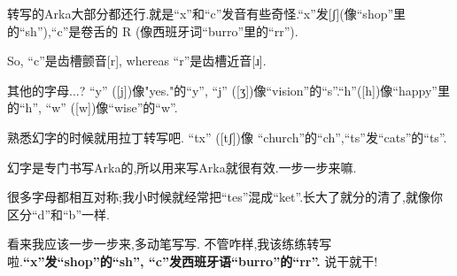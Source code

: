 转写的Arka大部分都还行.就是``x''和``c''发音有些奇怪.``x''发[ʃ](像``shop''里的``sh''),``c''是卷舌的 R (像西班牙词``burro''里的``rr'').

So, ``c''是齿槽颤音[r], whereas ``r''是齿槽近音[ɹ].

其他的字母...? ``y'' ([j])像"yes."的``y'', ``j'' ([ʒ])像``vision''的``s''.``h''([h])像``happy''里的``h'', ``w'' ([w])像``wise''的``w''.


熟悉幻字的时候就用拉丁转写吧. ``tx'' ([tʃ])像  ``church''的``ch'',``ts''发``cats''的``ts''.

幻字是专门书写Arka的,所以用来写Arka就很有效.一步一步来嘛.

很多字母都相互对称;我小时候就经常把``tes''混成``ket''.长大了就分的清了,就像你区分``d''和``b''一样.


看来我应该一步一步来,多动笔写写.
不管咋样,我该练练转写啦.\textbf{``x''发``shop''的``sh'', ``c''发西班牙语``burro''的``rr''.}
说干就干!



